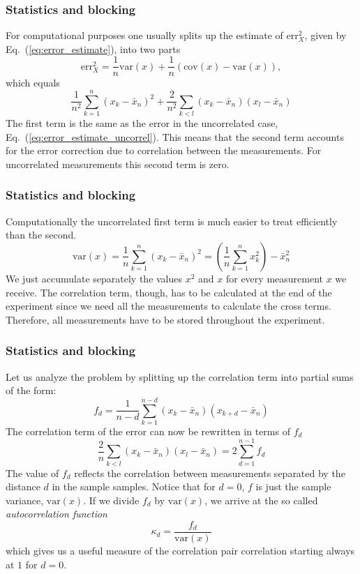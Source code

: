 \documentclass{beamer}
\begin{document}
\begin{frame}
\frametitle{Statistics and blocking}

\begin{block}{}
For computational purposes one usually splits up the estimate of
$\mathrm{err}_X^2$, given by Eq.~(\ref{eq:error_estimate}), into two
parts
\[
\mathrm{err}_X^2 = \frac{1}{n}\mathrm{var}(x) + \frac{1}{n}(\mathrm{cov}(x)-\mathrm{var}(x)),
\]
which equals
\begin{equation}
\frac{1}{n^2}\sum_{k=1}^n (x_k - \bar x_n)^2 +\frac{2}{n^2}\sum_{k<l} (x_k - \bar x_n)(x_l - \bar x_n)
\label{eq:error_estimate_split_up}
\end{equation}
The first term is the same as the error in the uncorrelated case,
Eq.~(\ref{eq:error_estimate_uncorrel}). This means that the second
term accounts for the error correction due to correlation between the
measurements. For uncorrelated measurements this second term is zero.
\end{block}
\end{frame}

\begin{frame}
\frametitle{Statistics and blocking}

\begin{block}{}
Computationally the uncorrelated first term is much easier to treat
efficiently than the second.
\[
\mathrm{var}(x) = \frac{1}{n}\sum_{k=1}^n (x_k - \bar x_n)^2 =
\left(\frac{1}{n}\sum_{k=1}^n x_k^2\right) - \bar x_n^2
\]
We just accumulate separately the values $x^2$ and $x$ for every
measurement $x$ we receive. The correlation term, though, has to be
calculated at the end of the experiment since we need all the
measurements to calculate the cross terms. Therefore, all measurements
have to be stored throughout the experiment.
\end{block}
\end{frame}

\begin{frame}
\frametitle{Statistics and blocking}

\begin{block}{}
Let us analyze the problem by splitting up the correlation term into
partial sums of the form:
\[
f_d = \frac{1}{n-d}\sum_{k=1}^{n-d}(x_k - \bar x_n)(x_{k+d} - \bar x_n)
\]
The correlation term of the error can now be rewritten in terms of
$f_d$
\[
\frac{2}{n}\sum_{k<l} (x_k - \bar x_n)(x_l - \bar x_n) =
2\sum_{d=1}^{n-1} f_d
\]
The value of $f_d$ reflects the correlation between measurements
separated by the distance $d$ in the sample samples.  Notice that for
$d=0$, $f$ is just the sample variance, $\mathrm{var}(x)$. If we divide $f_d$
by $\mathrm{var}(x)$, we arrive at the so called \emph{autocorrelation function}
\[
\kappa_d = \frac{f_d}{\mathrm{var}(x)}
\]
which gives us a useful measure of the correlation pair correlation
starting always at $1$ for $d=0$.
\end{block}
\end{frame}
\end{document}
